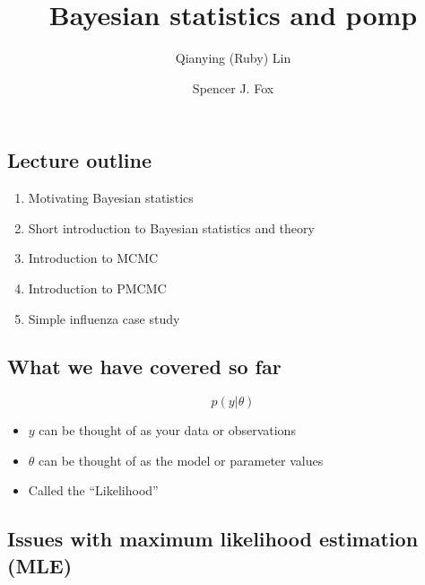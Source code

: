 \documentclass[
  letterpaper,
  DIV=11,
  numbers=noendperiod]{scrartcl}
\title{Bayesian statistics and pomp}
\author{Qianying (Ruby) Lin \and Spencer J. Fox}
\date{}
\providecommand{\tightlist}{%
  \setlength{\itemsep}{0pt}\setlength{\parskip}{0pt}}\usepackage{longtable,booktabs,array}
\begin{document}
\maketitle
\ifdefined\Shaded\renewenvironment{Shaded}{\begin{tcolorbox}[interior hidden, boxrule=0pt, sharp corners, borderline west={3pt}{0pt}{shadecolor}, enhanced, breakable, frame hidden]}{\end{tcolorbox}}\fi

\hypertarget{lecture-outline}{%
\subsection{Lecture outline}\label{lecture-outline}}

\begin{enumerate}
\def\labelenumi{\arabic{enumi}.}
\tightlist
\item
  Motivating Bayesian statistics
\item
  Short introduction to Bayesian statistics and theory
\item
  Introduction to MCMC
\item
  Introduction to PMCMC
\item
  Simple influenza case study
\end{enumerate}

\hypertarget{what-we-have-covered-so-far}{%
\subsection{What we have covered so
far}\label{what-we-have-covered-so-far}}

\Huge

\[p(y|\theta)\]

\Large

\begin{itemize}
\tightlist
\item
  \(y\) can be thought of as your data or observations
\item
  \(\theta\) can be thought of as the model or parameter values
\item
  Called the ``Likelihood''
\end{itemize}

\normalsize

\hypertarget{issues-with-maximum-likelihood-estimation-mle}{%
\subsection{Issues with maximum likelihood estimation
(MLE)}\label{issues-with-maximum-likelihood-estimation-mle}}
\end{document}
